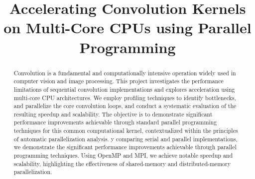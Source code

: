 \documentclass[conference, 10pt]{IEEEtran}
\begin{document}
\title{Accelerating Convolution Kernels on Multi-Core CPUs using Parallel Programming}
\author{
\and
\and
\and
}


\maketitle 

\begin{abstract}
Convolution is a fundamental and computationally intensive operation widely used in computer vision and image processing. 
This project investigates the performance limitations of sequential convolution implementations and explores acceleration using multi-core CPU architectures. 
We employ profiling techniques to identify bottlenecks, 
and parallelize the core convolution loops, and conduct a systematic evaluation of the resulting speedup and scalability. 
The objective is to demonstrate significant performance improvements achievable through standard parallel programming techniques for this common computational kernel, 
contextualized within the principles of automatic parallelization analysis.
y comparing serial and parallel implementations, we demonstrate the significant performance improvements achievable through parallel programming techniques. Using OpenMP and MPI, we achieve notable speedup and scalability, highlighting the effectiveness of shared-memory and distributed-memory parallelization. 
\end{abstract}
\end{document}

